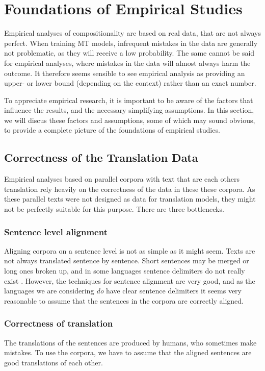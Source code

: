 \documentclass[hidelinks]{report}
\begin{document}
\section{Foundations of Empirical Studies}
\label{sec:assumptions}

Empirical analyses of compositionality are based on real data, that are not always perfect. When training MT models, infrequent mistakes in the data are generally not problematic, as they will receive a low probability. The same cannot be said for empirical analyses, where mistakes in the data will almost always harm the outcome. It therefore seems sensible to see empirical analysis as providing an upper- or lower bound (depending on the context) rather than an exact number. 

To appreciate empirical research, it is important to be aware of the factors that influence the results, and the necessary simplifying assumptions. In this section, we will discus these factors and assumptions, some of which may sound obvious, to provide a complete picture of the foundations of empirical studies.

\subsection{Correctness of the Translation Data}

Empirical analyses based on parallel corpora with text that are each others translation rely heavily on the correctness of the data in these these corpora. As these parallel texts were not designed as data for translation models, they might not be perfectly suitable for this purpose. There are three bottlenecks.

\subsubsection{Sentence level alignment}
Aligning corpora on a sentence level is not as simple as it might seem. Texts are not always translated sentence by sentence. Short sentences may be merged or long ones broken up, and in some languages sentence delimiters do not really exist \citep[p.55]{koehn2008statistical}. However, the techniques for sentence alignment are very good, and as the languages we are considering \textit{do} have clear sentence delimiters it seems very reasonable to assume that the sentences in the corpora are correctly aligned.

\subsubsection{Correctness of translation}
The translations of the sentences are produced by humans, who sometimes make mistakes. To use the corpora, we have to assume that the aligned sentences are good translations of each other.
\end{document}
